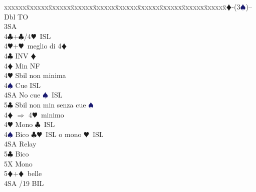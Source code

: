 \documentclass[a4paper,italian]{article}
\newcommand{\BC}{\textcolor{OliveGreen}{$\clubsuit$}}
\newcommand{\BD}{\textcolor{RedOrange}{$\vardiamondsuit$}}
\newcommand{\BH}{\textcolor{Red2}{$\varheartsuit${}}}
\newcommand{\BS}{\textcolor{MidnightBlue}{$\spadesuit${}}}
\newenvironment{bidtable}
{\begin{tabbing}

    xxxxxx\=xxxxxx\=xxxxxx\=xxxxxx\=xxxxxx\=xxxxxx\=xxxxxx\=xxxxxx\=xxxxxx\=xxxxxx\=\kill}
{\end{tabbing} }%
\begin{document}
\begin{multicols}{2}
                                        \begin{bidtable}
                                            1\BD-(3\BS)--\+\\
                                            Dbl \> TO\+\\
                                            3SA\+\\
                                            4\BC {}+\BC /4\BH\ ISL\\
                                            4\BH {}+\BH\ meglio di 4\BD \-\-\\
                                            4\BC \> INV \BD\+\\
                                            4\BD \> Min NF\\
                                            4\BH \> Sbil non minima\\
                                            4\BS \> Cue ISL\\
                                            4SA \> No cue \BS\ ISL\\
                                            5\BC \> Sbil non min senza cue \BS \-\\
                                            4\BD \> $\Rightarrow$ 4\BH\ minimo\\
                                            4\BH \> Mono \BC\ ISL\\
                                            4\BS \> Bico \BC \BH\ ISL o mono \BH\ ISL\+\\
                                            4SA \> Relay\+\\
                                            5\BC \> Bico\\
                                            5X \> Mono\-\\
                                            5\BD {}+\BD\ belle\-\\
                                            4SA /19 BIL\-
                                        \end{bidtable}

                                    \end{multicols}

                                    \pagebreak
\end{document}
